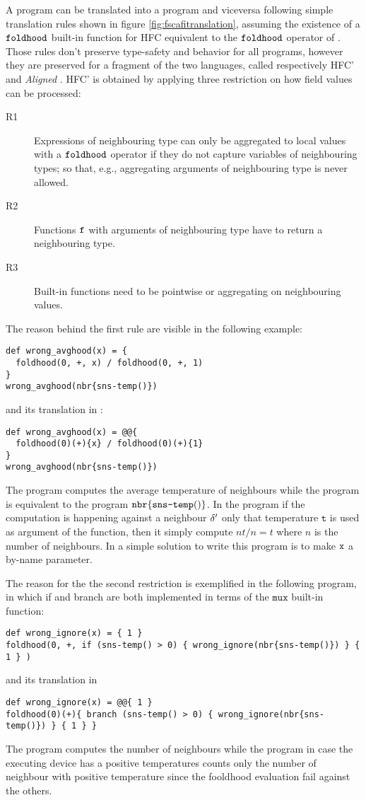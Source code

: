 A \FSCAFI program can be translated into a \HFC{} program and viceversa following simple translation rules shown in figure \ref{fig:fscafitranslation}, assuming the existence of a $\mathtt{foldhood}$ built-in function for HFC equivalent to the $\mathtt{foldhood}$ operator of \FSCAFI. Those rules don't preserve type-safety and behavior for all programs, however they are preserved for a fragment of the two languages, called respectively HFC' and \textit{Aligned} \FSCAFI. HFC' is obtained by applying three restriction on how field values can be processed:
\begin{description}
	\item[R1]
	Expressions of neighbouring type can only be aggregated to local values with a $\mathtt{foldhood}$ operator if they do not capture variables of neighbouring types; so that, e.g., aggregating arguments of neighbouring type is never allowed.
	\item[R2]
	Functions $\mathtt{f}$ with arguments of neighbouring type have to return a neighbouring type.
	\item[R3]
	Built-in functions need to be pointwise or aggregating on neighbouring values.
\end{description}
The reason behind the first rule are visible in the following example:
\begin{lstlisting}[]
def wrong_avghood(x) = {
  foldhood(0, +, x) / foldhood(0, +, 1)
}
wrong_avghood(nbr{sns-temp()})
\end{lstlisting}
and its translation in  \FSCAFI:
\begin{lstlisting}[]
def wrong_avghood(x) = @@{
  foldhood(0)(+){x} / foldhood(0)(+){1}
}
wrong_avghood(nbr{sns-temp()})
\end{lstlisting}
The \HFC{} program computes the average temperature of neighbours while the \FSCAFI{} program is equivalent to the program $\mathtt{nbr}\{\texttt{sns-temp}()\}$. In the \FSCAFI program if the computation is happening against a neighbour $\delta'$ only that temperature $\mathtt{t}$ is used as argument of the function, then it simply compute $nt/n = t$ where $n$ is the number of neighbours. In \Scafi{} a simple solution to write this program is to make $\mathtt{x}$ a by-name parameter.

The reason for the the second restriction is exemplified in the following program, in which if and branch are both implemented in terms of the $\mathtt{mux}$ built-in function:
\begin{lstlisting}[]
def wrong_ignore(x) = { 1 }
foldhood(0, +, if (sns-temp() > 0) { wrong_ignore(nbr{sns-temp()}) } { 1 } )
\end{lstlisting}
and its translation in  \FSCAFI{}
\begin{lstlisting}[]
def wrong_ignore(x) = @@{ 1 }
foldhood(0)(+){ branch (sns-temp() > 0) { wrong_ignore(nbr{sns-temp()}) } { 1 } }
\end{lstlisting}
The \HFC{} program computes the number of neighbours while the \FSCAFI{} program in case the executing device has a positive temperatures counts only the number of neighbour with positive temperature since the fooldhood evaluation fail against the others.

